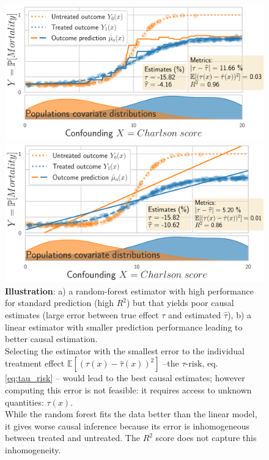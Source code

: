 \documentclass[10pt,twocolumn]{article}
\begin{document}
\begin{figure}[h!]
    {\sffamily\footnotesize{}}

    \includegraphics[width=1\linewidth]{images/toy_random_forest_high_R2_high_tau_risk.pdf}%

    {\sffamily\footnotesize{}}

    \hfill%
    \includegraphics[width=1\linewidth]{images/toy_tlinear_model_small_R2_small_tau_risk.pdf}%

    \caption[The best predictor may not estimate best causal
        effects]{\textbf{Illustration}: a) a random-forest estimator
        with high performance for standard prediction (high $R^2$) but that
        yields poor causal estimates (large error between true effect $\tau$ and
        estimated $\hat{\tau}$), b) a linear estimator with smaller
        prediction performance leading to better causal estimation. \\[1ex]
        Selecting the estimator with the smallest error to the individual
        treatment effect $\mathbb{E}[(\tau(x) - \hat{\tau}(x))^2]$
        --the $\tau\text{-risk}$, eq.\,\ref{eq:tau_risk} -- would lead to
        the best causal estimates; however computing this error is not
        feasible: it requires access to unknown quantities:
        $\tau(x)$. \\[1ex]
        While the random forest fits the data better than the linear model, it
        gives worse causal inference because its error is inhomogeneous between
        treated and untreated. The $R^2$ score does not capture this
        inhomogeneity.
        \label{fig:toy_example}
    }
\end{figure}
\end{document}
